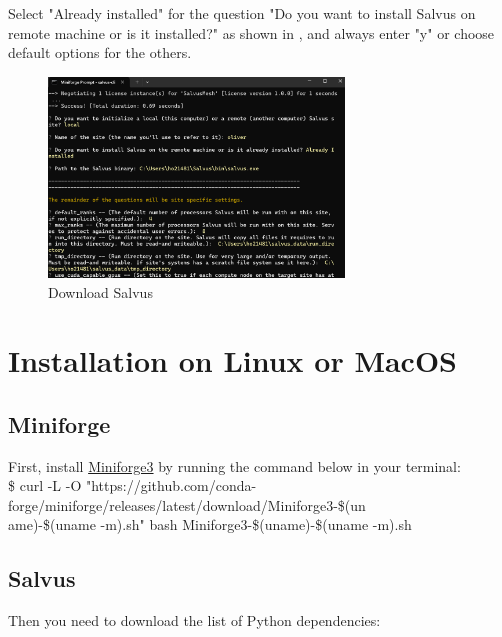 \documentclass[a4paper, 12pt]{article}
\theoremstyle{plain}
\begin{document}
\noindent
Select "Already installed" for the question "Do you want to install Salvus on remote machine or is it installed?" as shown in , and always enter "y" or choose default options for the others.

\begin{figure}[H]
  \centering
  \includegraphics[width=0.7\textwidth]{config_detail}
  \caption{Download Salvus}
  \label{fig:config_detail}
\end{figure}



\newpage

\section{Installation on Linux or MacOS}
\subsection*{Miniforge}

First, install \href{https://github.com/conda-forge/miniforge}{Miniforge3} by running the command below in your terminal:\\

\noindent
\$  \hspace{0.1cm} curl -L -O "https://github.com/conda-forge/miniforge/releases/latest/download/Miniforge3-\$(un\\ame)-\$(uname -m).sh"
bash Miniforge3-\$(uname)-\$(uname -m).sh\\



\subsection*{Salvus}
Then you need to download the list of Python dependencies:\\
\end{document}
